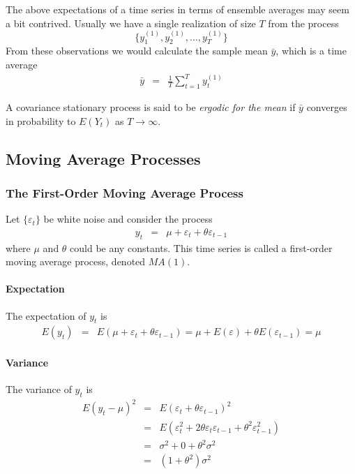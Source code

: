 The above expectations of a time series in terms of ensemble averages may seem a bit contrived. Usually we have a single realization of size $T$ from the process 
$$\{y_{1}^{(1)},y_{2}^{(1)},\dots,y_{T}^{(1)}\}$$
From these observations we would calculate the sample mean $\bar{y}$, which is a time average
\begin{eqnarray*}
\bar{y}&=&\frac{1}{T}\sum_{t=1}^{T}y_{t}^{(1)}
\end{eqnarray*}

A covariance stationary process is said to be \textit{ergodic for the mean} if $\bar{y}$ converges in probability to $E(Y_{t})$ as $T\to\infty$. 

\subsection{Moving Average Processes}
\subsubsection{The First-Order Moving Average Process}
Let $\{\varepsilon_{t}\}$ be white noise and consider the process
\begin{eqnarray*}
y_{t}&=&\mu+\varepsilon_{t}+\theta\varepsilon_{t-1}
\end{eqnarray*}
where $\mu$ and $\theta$ could be any constants. This time series is called a first-order moving average process, denoted $MA(1)$.

\paragraph{Expectation}
The expectation of $y_{t}$ is 
\begin{eqnarray*}
E(y_{t})&=&E(\mu+\varepsilon_{t}+\theta\varepsilon_{t-1})=\mu+E(\varepsilon)+\theta E(\varepsilon_{t-1})=\mu
\end{eqnarray*}

\paragraph{Variance}
The variance of $y_{t}$ is 
\begin{eqnarray*}
E(y_{t}-\mu)^{2}&=&E(\varepsilon_{t}+\theta\varepsilon_{t-1})^{2}\\
&=&E\left(\varepsilon_{t}^{2}+2\theta\varepsilon_{t}\varepsilon_{t-1}+\theta^{2}\varepsilon_{t-1}^{2}\right)\\
&=&\sigma^{2}+0+\theta^{2}\sigma^{2}\\
&=&(1+\theta^{2})\sigma^{2}
\end{eqnarray*}


